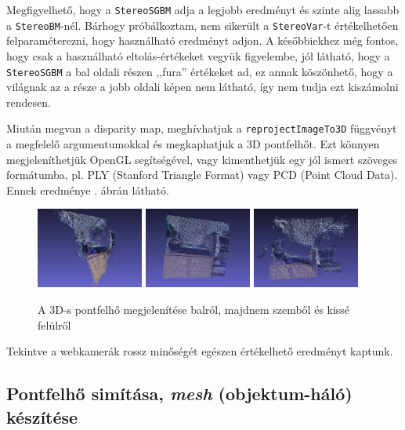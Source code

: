 \documentclass[a4paper,oneside]{article}
\begin{document}
Megfigyelhető, hogy a \texttt{StereoSGBM} adja a legjobb eredményt és szinte alig lassabb a \texttt{StereoBM}-nél. Bárhogy próbálkoztam, nem sikerült a \texttt{StereoVar}-t értékelhetően felparaméterezni, hogy használható eredményt adjon. A későbbiekhez még fontos, hogy csak a használható eltolás-értékeket vegyük figyelembe, jól látható, hogy a \texttt{StereoSGBM} a bal oldali részen ,,fura'' értékeket ad, ez annak köszönhető, hogy a világnak az a része a jobb oldali képen nem látható, így nem tudja ezt kiszámolni rendesen.

Miután megvan a disparity map, meghívhatjuk a \texttt{reprojectImageTo3D} függvényt a megfelelő argumentumokkal és megkaphatjuk a 3D pontfelhőt. Ezt könnyen megjeleníthetjük OpenGL segítségével, vagy kimenthetjük egy jól ismert szöveges formátumba, pl. PLY (Stanford Triangle Format) vagy PCD (Point Cloud Data). Ennek eredménye . ábrán látható.

\begin{figure}[tbh]
  \centering
  \includegraphics[width=100pt]{figs/snapshot00.png}
  \includegraphics[width=100pt]{figs/snapshot01.png}
  \includegraphics[width=100pt]{figs/snapshot02.png}
  \caption{A 3D-s pontfelhő megjelenítése balról, majdnem szemből és kissé felülről \label{fig:pcd}}
\end{figure}

Tekintve a webkamerák rossz minőségét egészen értékelhető eredményt kaptunk.

\subsection{Pontfelhő simítása, \textit{mesh} (objektum-háló) készítése}
\end{document}
